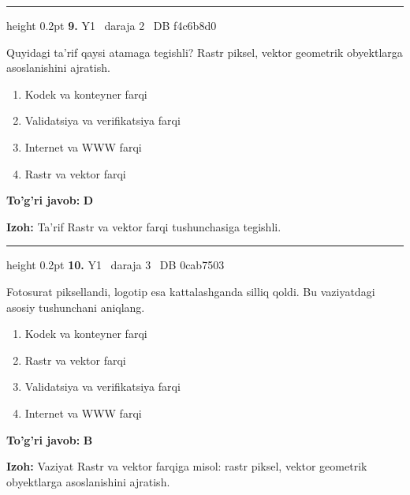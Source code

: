 \documentclass[10pt,a4paper,oneside]{article}
\begin{document}
\vspace{2mm}\hrule height 0.2pt \vspace{4mm}
\hypertarget{q9}{\textbf{\color{ink}9.}}  {\color{muted}\scriptsize Y1 \textbullet\ daraja 2 \textbullet\ DB f4c6b8d0}
\par
Quyidagi ta'rif qaysi atamaga tegishli? Rastr piksel, vektor geometrik obyektlarga asoslanishini ajratish.
\begin{enumerate}[label=\Alph*),leftmargin=9mm]
\item Kodek va konteyner farqi
\item Validatsiya va verifikatsiya farqi
\item Internet va WWW farqi
\item Rastr va vektor farqi
\end{enumerate}
\begin{tcolorbox}[enhanced,breakable,colback=teal!4,colframe=teal!45!black,boxrule=0.45pt,arc=1.2mm,left=2.8mm,right=2.8mm,top=2mm,bottom=2mm,before skip=2mm,after skip=2mm]
\textbf{\color{teal}To'g'ri javob:} \textbf{D}
\par\smallskip
\textbf{Izoh:} Ta'rif Rastr va vektor farqi tushunchasiga tegishli.
\end{tcolorbox}
\vspace{2mm}\hrule height 0.2pt \vspace{4mm}
\hypertarget{q10}{\textbf{\color{ink}10.}}  {\color{muted}\scriptsize Y1 \textbullet\ daraja 3 \textbullet\ DB 0cab7503}
\par
Fotosurat piksellandi, logotip esa kattalashganda silliq qoldi. Bu vaziyatdagi asosiy tushunchani aniqlang.
\begin{enumerate}[label=\Alph*),leftmargin=9mm]
\item Kodek va konteyner farqi
\item Rastr va vektor farqi
\item Validatsiya va verifikatsiya farqi
\item Internet va WWW farqi
\end{enumerate}
\begin{tcolorbox}[enhanced,breakable,colback=teal!4,colframe=teal!45!black,boxrule=0.45pt,arc=1.2mm,left=2.8mm,right=2.8mm,top=2mm,bottom=2mm,before skip=2mm,after skip=2mm]
\textbf{\color{teal}To'g'ri javob:} \textbf{B}
\par\smallskip
\textbf{Izoh:} Vaziyat Rastr va vektor farqiga misol: rastr piksel, vektor geometrik obyektlarga asoslanishini ajratish.
\end{tcolorbox}
\end{document}
